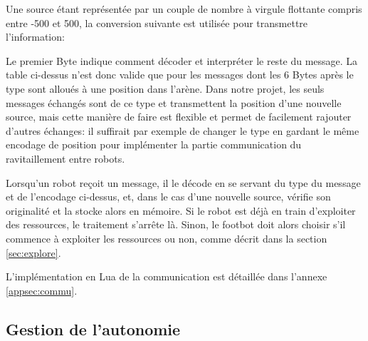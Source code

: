 Une source étant représentée par un couple de nombre à virgule flottante compris entre -500 et 500, la conversion suivante est utilisée pour transmettre l'information:

\vspace{1em}

\vspace{1em}

Le premier Byte indique comment décoder et interpréter le reste du message. La table ci-dessus n'est donc valide que pour les messages dont les 6 Bytes après le type sont alloués à une position dans l'arène. Dans notre projet, les seuls messages échangés sont de ce type et transmettent la position d'une nouvelle source, mais cette manière de faire est flexible et permet de facilement rajouter d'autres échanges: il suffirait par exemple de changer le type en gardant le même encodage de position pour implémenter la partie communication du ravitaillement entre robots.

Lorsqu'un robot reçoit un message, il le décode en se servant du type du message et de l'encodage ci-dessus, et, dans le cas d'une nouvelle source, vérifie son originalité et la stocke alors en mémoire. Si le robot est déjà en train d'exploiter des ressources, le traitement s'arrête là. Sinon, le footbot doit alors choisir s'il commence à exploiter les ressources ou non, comme décrit dans la section \ref{sec:explore}.

L'implémentation en Lua de la communication est détaillée dans l'annexe \ref{appsec:commu}.

\subsection{Gestion de l'autonomie}

